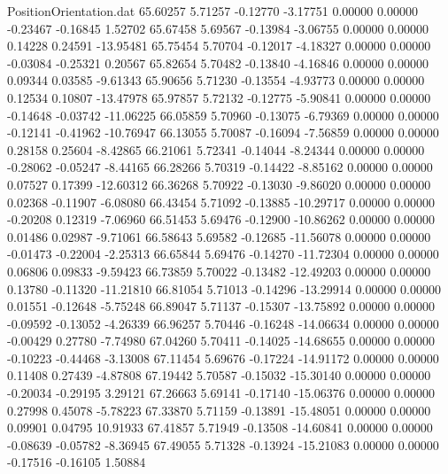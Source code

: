 \begin{filecontents}{PositionOrientation.dat}
  65.60257    5.71257   -0.12770    -3.17751    0.00000    0.00000   -0.23467   -0.16845    1.52702
  65.67458    5.69567   -0.13984    -3.06755    0.00000    0.00000    0.14228    0.24591  -13.95481
  65.75454    5.70704   -0.12017    -4.18327    0.00000    0.00000   -0.03084   -0.25321    0.20567
  65.82654    5.70482   -0.13840    -4.16846    0.00000    0.00000    0.09344    0.03585   -9.61343
  65.90656    5.71230   -0.13554    -4.93773    0.00000    0.00000    0.12534    0.10807  -13.47978
  65.97857    5.72132   -0.12775    -5.90841    0.00000    0.00000   -0.14648   -0.03742  -11.06225
  66.05859    5.70960   -0.13075    -6.79369    0.00000    0.00000   -0.12141   -0.41962  -10.76947
  66.13055    5.70087   -0.16094    -7.56859    0.00000    0.00000    0.28158    0.25604   -8.42865
  66.21061    5.72341   -0.14044    -8.24344    0.00000    0.00000   -0.28062   -0.05247   -8.44165
  66.28266    5.70319   -0.14422    -8.85162    0.00000    0.00000    0.07527    0.17399  -12.60312
  66.36268    5.70922   -0.13030    -9.86020    0.00000    0.00000    0.02368   -0.11907   -6.08080
  66.43454    5.71092   -0.13885   -10.29717    0.00000    0.00000   -0.20208    0.12319   -7.06960
  66.51453    5.69476   -0.12900   -10.86262    0.00000    0.00000    0.01486    0.02987   -9.71061
  66.58643    5.69582   -0.12685   -11.56078    0.00000    0.00000   -0.01473   -0.22004   -2.25313
  66.65844    5.69476   -0.14270   -11.72304    0.00000    0.00000    0.06806    0.09833   -9.59423
  66.73859    5.70022   -0.13482   -12.49203    0.00000    0.00000    0.13780   -0.11320  -11.21810
  66.81054    5.71013   -0.14296   -13.29914    0.00000    0.00000    0.01551   -0.12648   -5.75248
  66.89047    5.71137   -0.15307   -13.75892    0.00000    0.00000   -0.09592   -0.13052   -4.26339
  66.96257    5.70446   -0.16248   -14.06634    0.00000    0.00000   -0.00429    0.27780   -7.74980
  67.04260    5.70411   -0.14025   -14.68655    0.00000    0.00000   -0.10223   -0.44468   -3.13008
  67.11454    5.69676   -0.17224   -14.91172    0.00000    0.00000    0.11408    0.27439   -4.87808
  67.19442    5.70587   -0.15032   -15.30140    0.00000    0.00000   -0.20034   -0.29195    3.29121
  67.26663    5.69141   -0.17140   -15.06376    0.00000    0.00000    0.27998    0.45078   -5.78223
  67.33870    5.71159   -0.13891   -15.48051    0.00000    0.00000    0.09901    0.04795   10.91933
  67.41857    5.71949   -0.13508   -14.60841    0.00000    0.00000   -0.08639   -0.05782   -8.36945
  67.49055    5.71328   -0.13924   -15.21083    0.00000    0.00000   -0.17516   -0.16105    1.50884

\end{filecontents}
